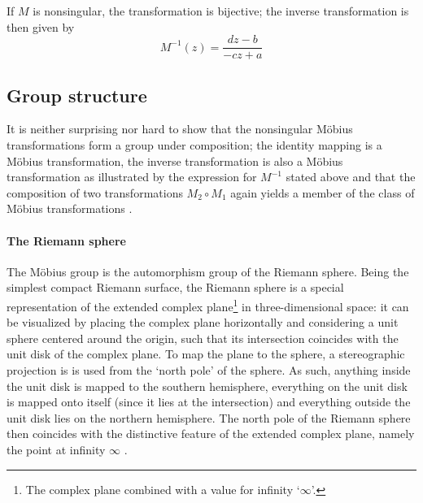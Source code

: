 If \(M\) is nonsingular, the transformation is bijective; the inverse transformation is then given by \cite{Needham1997}
\[ M^{-1}(z) = \frac{dz - b}{-cz + a} \]
    
\subsection{Group structure}
It is neither surprising nor hard to show that the nonsingular Möbius transformations form a group under composition; the identity mapping is a Möbius transformation, the inverse transformation is also a Möbius transformation as illustrated by the expression for \(M^{-1}\) stated above and that the composition of two transformations \(M_2 \circ M_1\) again yields a member of the class of Möbius transformations \cite{Needham1997}. 

\paragraph{The Riemann sphere} 
The Möbius group is the automorphism group of the Riemann sphere. Being the simplest compact Riemann surface, the Riemann sphere is a special representation of the extended complex plane\footnote{The complex plane combined with a value for infinity `\(\infty\)'.} in three-dimensional space: it can be visualized by placing the complex plane horizontally and considering a unit sphere centered around the origin, such that its intersection coincides with the unit disk of the complex plane. To map the plane to the sphere, a stereographic projection is is used from the `north pole' of the sphere. As such, anything inside the unit disk is mapped to the southern hemisphere, everything on the unit disk is mapped onto itself (since it lies at the intersection) and everything outside the unit disk lies on the northern hemisphere. The north pole of the Riemann sphere then coincides with the distinctive feature of the extended complex plane, namely the point at infinity \(\infty\) \cite{Needham1997}.

